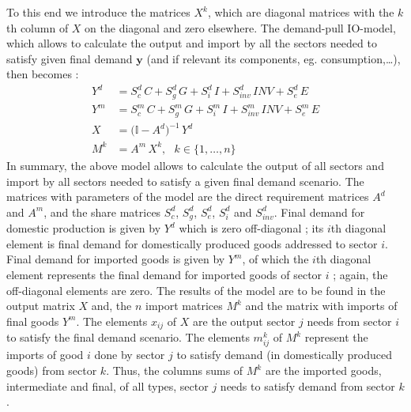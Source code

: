 \documentclass[12pt,english]{article}
\begin{document}
To this end we introduce the matrices $X^k$, which are diagonal matrices with the $k$th column of $X$ on the diagonal and zero elsewhere. The demand-pull IO-model, which allows to calculate the output and import by all the sectors needed to satisfy given final demand $\boldsymbol{y}$ (and if relevant its components, eg. consumption,\ldots), then becomes :
\begin{align}
Y^d &= S^d_{c} \, C + S^d_{g} \, G + S^d_{i} \, I + S^d_{inv} \, INV + S^d_{e} \, E \label{IOmodel_Yd} \\
Y^m &= S^m_{c} \,C + S^m_{g}\, G + S^m_{i}\, I + S^m_{inv}\, INV + S^m_{e}\, E 		\label{IOmodel_Ym} \\
X &= \big(\mathbb{I} - A^d \big)^{-1} \, Y^d  										\label{IOmodel_X} \\
M^k &= A^m \, X^k, \ \ \  k \in \{1,\ldots,n\} 							\label{IOmodel_Mk}
\end{align}
In summary, the above model allows to calculate the output of all sectors and import by all sectors needed to satisfy a given final demand scenario. The matrices with parameters of the model are the direct requirement matrices $A^d$ and $A^m$, and the share matrices $S^d_{c}$, $S^d_{g}$, $S^d_{e}$, $S^d_{i}$ and $S^d_{inv}$. Final demand for domestic production is given by $Y^d$ which is zero off-diagonal ; its $i$th diagonal element is final demand for domestically produced goods addressed to sector $i$. Final demand for imported goods is given by $Y^m$, of which the $i$th diagonal element represents the final demand for imported goods of sector $i$ ; again, the off-diagonal elements are zero. The results of the model are to be found in the output matrix $X$ and, the $n$ import matrices $M^k$ and the matrix with imports of final goods $Y^m$. The elements $x_{ij}$ of $X$ are the output sector $j$ needs from sector $i$ to satisfy the final demand scenario. The elements $m^k_{ij}$ of $M^k$ represent the imports of good $i$ done by sector $j$ to satisfy demand (in domestically produced goods) from sector $k$. Thus, the columns sums of $M^k$ are the imported goods, intermediate and final, of all types, sector $j$ needs to satisfy demand from sector $k$.


\end{document}
